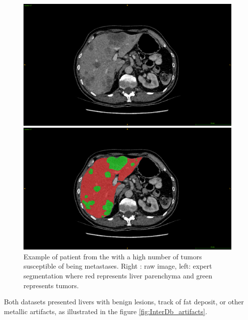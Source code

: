 {\begin{figure}[!ht]
	\begin{mdframed}[backgroundcolor=blue!50,linecolor=blue!50]
		\centering
		\begin{minipage}{0.45\linewidth}
			\includegraphics[width=\linewidth]{images/LITS_examplePatientMeta}
		\end{minipage} \hspace{-0.1cm}
		\begin{minipage}{0.45\linewidth}
			\includegraphics[width=\linewidth]{images/LITS_examplePatientMeta_seg}
		\end{minipage}
	\end{mdframed}
	\caption{Example of patient from the \textbf{} with a high number of tumors susceptible of being metastases. Right : raw image, left: expert segmentation where red represents liver parenchyma and green represents tumors.}
	\label{fig:litsDb_meta}
\end{figure}
Both datasets presented livers with benign lesions, track of fat deposit, or other metallic artifacts, as illustrated in the figure \ref{fig:InterDb_artifacts}.
}
